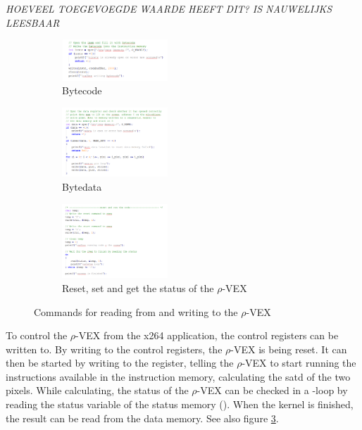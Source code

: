 \emph{HOEVEEL TOEGEVOEGDE WAARDE HEEFT DIT? IS NAUWELIJKS LEESBAAR}

\begin{figure}[htb]
	\centering
	\begin{subfigure} [h] {0.3\textwidth}
		\centering
		\includegraphics[width=150px]{Pictures/imem}
		\caption{Bytecode}
		\label{fig:imem}
	\end{subfigure}
	\quad
	\begin{subfigure} [h] {0.3\textwidth}
		\centering
		\includegraphics[width=150px]{Pictures/dmem}
		\caption{Bytedata}
		\label{fig:dmem}
	\end{subfigure}
	\quad
	\begin{subfigure} [h] {0.3\textwidth}
		\centering
		\includegraphics[width=150px]{Pictures/smem}
		\caption{Reset, set and get the status of the $\rho$-VEX}
		\label{fig:smem}
	\end{subfigure}
	\quad
\caption{Commands for reading from and writing to the $\rho$-VEX}%
\label{}%
\end{figure}

To control the $\rho$-VEX from the x264 application, the control registers can be written to. By writing  to the control registers, the $\rho$-VEX is being reset. It can then be started by writing  to the register, telling the $\rho$-VEX to start running the instructions available in the instruction memory, calculating the satd of the two pixels. While calculating, the status of the $\rho$-VEX can be checked in a -loop by reading the status variable of the status memory (). When the  kernel is finished, the result can be read from the data memory. See also figure \ref{fig:smem}.

